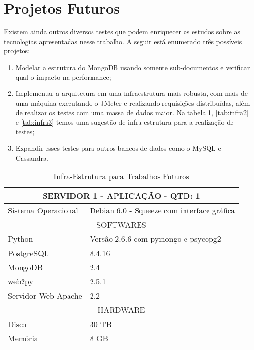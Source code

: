 \section{Projetos Futuros}

Existem ainda outros diversos testes que podem enriquecer os estudos sobre as tecnologias apresentadas nesse trabalho. A seguir está enumerado três possíveis projetos:

\begin{enumerate}
\item Modelar a estrutura do MongoDB usando somente sub-documentos e verificar qual o impacto na performance;
\item Implementar a arquitetura em uma infraestrutura mais robusta, com mais de uma máquina executando o JMeter e realizando requisições distribuídas, além de realizar os testes com uma massa de dados maior. Na tabela \ref{tab:infra1}, \ref{tab:infra2} e \ref{tab:infra3} temos uma sugestão de infra-estrutura para a realização de testes;
\item Expandir esses testes para outros bancos de dados como o MySQL e Cassandra.
\end{enumerate}

\begin{table}[h]
	\caption{Infra-Estrutura para Trabalhos Futuros}
	\begin{center}
	\begin{tabular} {|l|l|}
		\hline
			\multicolumn{2}{|c|}{SERVIDOR 1 - APLICAÇÃO - QTD: 1} \\
		\hline
			Sistema Operacional & Debian 6.0 - Squeeze com interface gráfica \\
		\hline
			\multicolumn{2}{|c|}{SOFTWARES}\\
		\hline
			Python & Versão 2.6.6 com pymongo e psycopg2\\
		\hline
			PostgreSQL & 8.4.16\\
		\hline
			MongoDB & 2.4\\
		\hline
			web2py & 2.5.1\\
		\hline
			Servidor Web Apache & 2.2\\
		\hline
			\multicolumn{2}{|c|}{HARDWARE}\\
		\hline
			Disco & 30 TB\\
		\hline
			Memória & 8 GB\\
		\hline
	\end {tabular}
	\end{center}
	\label{tab:infra1}
\end{table}

